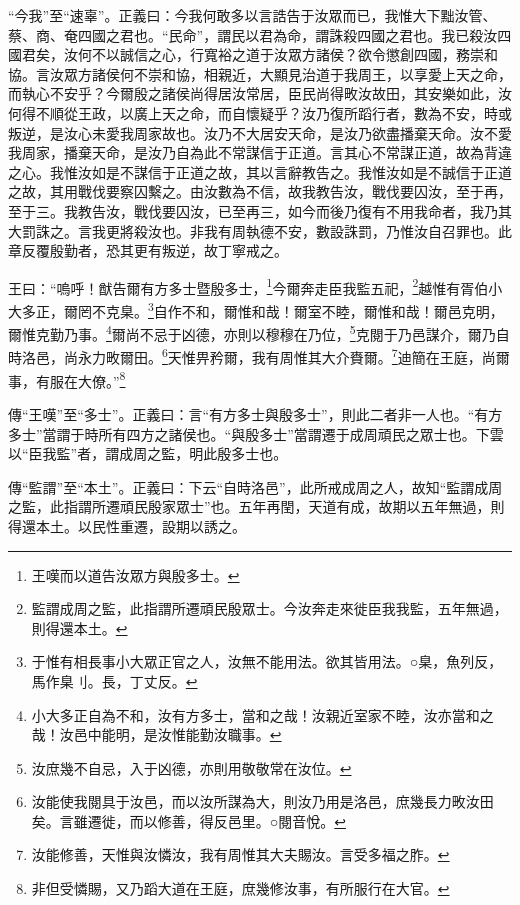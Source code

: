 {\noindent\shu{}\fzkt “今我”至“速辜”。正義曰：今我何敢多以言誥告于汝眾而已，我惟大下黜汝管、蔡、商、奄四國之君也。“民命”，謂民以君為命，謂誅殺四國之君也。我已殺汝四國君矣，汝何不以誠信之心，行寬裕之道于汝眾方諸侯？欲令懲創四國，務崇和協。言汝眾方諸侯何不崇和協，相親近，大顯見治道于我周王，以享愛上天之命，而執心不安乎？今爾殷之諸侯尚得居汝常居，臣民尚得畋汝故田，其安樂如此，汝何得不順從王政，以廣上天之命，而自懷疑乎？汝乃復所蹈行者，數為不安，時或叛逆，是汝心未愛我周家故也。汝乃不大居安天命，是汝乃欲盡播棄天命。汝不愛我周家，播棄天命，是汝乃自為此不常謀信于正道。言其心不常謀正道，故為背違之心。我惟汝如是不謀信于正道之故，其以言辭教告之。我惟汝如是不誠信于正道之故，其用戰伐要察囚繫之。由汝數為不信，故我教告汝，戰伐要囚汝，至于再，至于三。我教告汝，戰伐要囚汝，已至再三，如今而後乃復有不用我命者，我乃其大罰誅之。言我更將殺汝也。非我有周執德不安，數設誅罰，乃惟汝自召罪也。此章反覆殷勤者，恐其更有叛逆，故丁寧戒之。 \par}

王曰：“嗚呼！猷告爾有方多士暨殷多士，\footnote{王嘆而以道告汝眾方與殷多士。}今爾奔走臣我監五祀，\footnote{監謂成周之監，此指謂所遷頑民殷眾士。今汝奔走來徙臣我我監，五年無過，則得還本土。}越惟有胥伯小大多正，爾罔不克臬。\footnote{于惟有相長事小大眾正官之人，汝無不能用法。欲其皆用法。○臬，魚列反，馬作臬刂。長，丁丈反。}自作不和，爾惟和哉！爾室不睦，爾惟和哉！爾邑克明，爾惟克勤乃事。\footnote{小大多正自為不和，汝有方多士，當和之哉！汝親近室家不睦，汝亦當和之哉！汝邑中能明，是汝惟能勤汝職事。}爾尚不忌于凶德，亦則以穆穆在乃位，\footnote{汝庶幾不自忌，入于凶德，亦則用敬敬常在汝位。}克閱于乃邑謀介，爾乃自時洛邑，尚永力畋爾田。\footnote{汝能使我閱具于汝邑，而以汝所謀為大，則汝乃用是洛邑，庶幾長力畋汝田矣。言雖遷徙，而以修善，得反邑里。○閱音悅。}天惟畀矜爾，我有周惟其大介賚爾。\footnote{汝能修善，天惟與汝憐汝，我有周惟其大夫賜汝。言受多福之胙。}迪簡在王庭，尚爾事，有服在大僚。”\footnote{非但受憐賜，又乃蹈大道在王庭，庶幾修汝事，有所服行在大官。}


{\noindent\zhuan{}\fzbyks 傳“王嘆”至“多士”。正義曰：言“有方多士與殷多士”，則此二者非一人也。“有方多士”當謂于時所有四方之諸侯也。“與殷多士”當謂遷于成周頑民之眾士也。下雲以“臣我監”者，謂成周之監，明此殷多士也。 \par}

{\noindent\zhuan{}\fzbyks 傳“監謂”至“本土”。正義曰：下云“自時洛邑”，此所戒成周之人，故知“監謂成周之監，此指謂所遷頑民殷家眾士”也。五年再閏，天道有成，故期以五年無過，則得還本土。以民性重遷，設期以誘之。 \par}

